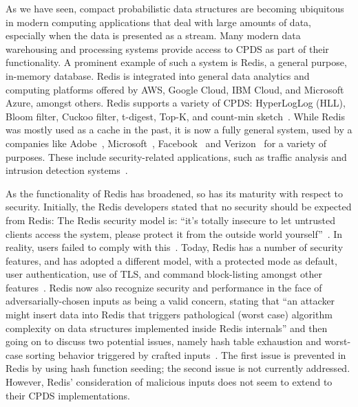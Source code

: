 As we have seen, compact probabilistic data structures are becoming ubiquitous in modern computing applications that deal with large amounts of data, especially when the data is presented as a stream. Many modern data warehousing and processing systems provide access to CPDS as part of their functionality.  A prominent example of such a system is Redis, a general purpose, in-memory database. Redis is integrated into general data analytics and computing platforms offered by AWS, Google Cloud, IBM Cloud, and Microsoft Azure, amongst others. Redis supports a variety of CPDS: HyperLogLog (HLL), Bloom filter, Cuckoo filter, t-digest, Top-K, and count-min sketch~\cite{redisPDS}. 
While Redis was mostly used as a cache in the past, it is now a fully general system, used by a companies like Adobe~\cite{Web:RedisForAdobe}, Microsoft~\cite{Web:RedisForMicrosoft}, Facebook~\cite{Web:RedisForFacebook} and Verizon~\cite{Web:RedisForVerizon} for a variety of purposes. These include security-related applications, such as traffic analysis and intrusion detection systems~\cite{Web:RedisForSiemens}.

As the functionality of Redis has broadened, so has its maturity with respect to security. Initially, the Redis developers stated that no security should be expected from Redis:
The Redis security model is: “it’s totally insecure to let untrusted clients access the system, please protect it from the outside world yourself”~\cite{antirez15}. In reality, users failed to comply with this~\cite{FiebigFP16}. Today, Redis has a number of security features, and has adopted a different model, with a protected mode as default, user authentication, use of TLS, and command block-listing amongst other features~\cite{redisSec}. Redis now also recognize security and performance in the face of adversarially-chosen inputs as being a valid concern, stating that ``an attacker might insert data into Redis that triggers pathological (worst case) algorithm complexity on data structures implemented inside Redis internals'' and then going on to discuss two potential issues, namely hash table exhaustion and worst-case sorting behavior triggered by crafted inputs~\cite{redisSec}. The first issue is prevented in Redis by using hash function seeding; the second issue is not currently addressed. However, Redis' consideration of malicious inputs does not seem to extend to their CPDS implementations.

